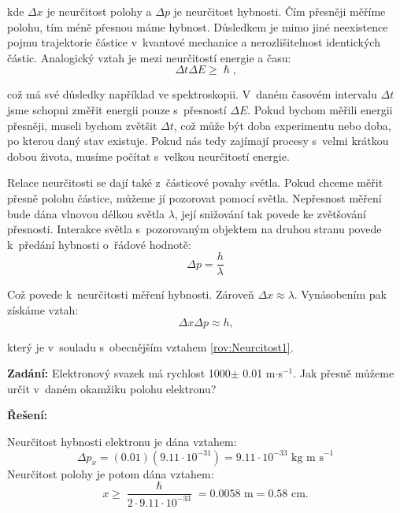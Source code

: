 \noindent kde $\Delta x$ je neurčitost polohy a $\Delta p$ je neurčitost hybnosti. Čím přesněji měříme polohu, tím méně přesnou máme hybnost. Důsledkem je mimo jiné neexistence pojmu trajektorie částice v~kvantové mechanice a nerozlišitelnost identických částic. Analogický vztah je mezi neurčitostí energie a času:
\begin{equation}
\Delta t \Delta E \geq \hslash\mbox{,}
\label{rov:Neurcitostě}
\end{equation}

\noindent což má své důsledky například ve spektroskopii. V~daném časovém intervalu $\Delta t$ jsme schopni změřit energii pouze s~přesností $\Delta E$. Pokud bychom měřili energii přesněji, museli bychom zvětšit $\Delta t$, což může být doba experimentu nebo doba, po kterou daný stav existuje. Pokud nás tedy zajímají procesy s~velmi krátkou dobou života, musíme počítat s~velkou neurčitostí energie.  

Relace neurčitosti se dají  také z~částicové povahy světla. Pokud chceme měřit přesně polohu částice, můžeme jí pozorovat pomocí světla. Nepřesnost měření bude dána vlnovou délkou světla $\lambda$, její snižování tak povede ke zvětšování přesnosti. Interakce světla s~pozorovaným objektem na druhou stranu povede k~předání hybnosti o~řádové hodnotě:
\begin{equation}
\Delta p = \frac{h}{\lambda}
\label{rov:Neurcitost2}
\end{equation}

\noindent Což povede k~neurčitosti měření hybnosti. Zároveň $\Delta x \approx \lambda $. Vynásobením pak získáme vztah:
\begin{equation}
\Delta x \Delta p \approx h \mbox{,}
\label{rov:Neurcitost3}
\end{equation}

\noindent který je v~souladu s~obecnějším vztahem \ref{rov:Neurcitost1}.
 
\begin{priklad}
\textbf{Zadání:}
Elektronový svazek má rychlost 1000$\pm $ 0.01 m$\cdot $s$^{-1}$. Jak přesně můžeme určit v~daném okamžiku polohu elektronu?

\textbf{Řešení:}

Neurčitost hybnosti elektronu je dána vztahem:
\begin{equation}
\Delta p_x = (0.01)(9.11\cdot 10^{-31}) = 9.11\cdot 10^{-33} \mbox{ kg m s}^{-1}
\nonumber
\end{equation}
Neurčitost polohy je potom dána vztahem:
\begin{equation}
x\geq\frac{\hslash}{2\cdot 9.11\cdot 10^{-33}} = 0.0058 \mbox{ m} = 0.58 \mbox{ cm.}
\nonumber
\end{equation}
\end{priklad}

